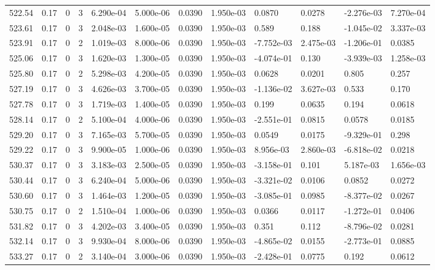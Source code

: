 \documentclass[preview]{standalone}
\begin{document}
{{{{{{{{{{{{{{{{\begin{tabular}{L{1.2cm}C{1.2cm} C{0.3cm}C{0.5cm} C{1.4cm}C{1.4cm} C{1.4cm}C{1.4cm} C{1.6cm}C{1.6cm} C{1.6cm}C{1.6cm}}
  522.54  &  0.17  & 0     &  3 &  6.290e-04  & 5.000e-06  &  0.0390&   1.950e-03& 0.0870 & 0.0278   &  -2.276e-03 & 7.270e-04  \\ 
  523.61  &  0.17  & 0     &  3 &  2.048e-03  & 1.600e-05  &  0.0390&   1.950e-03& 0.589 & 0.188   &  -1.045e-02 & 3.337e-03  \\ 
  523.91  &  0.17  & 0     &  2 &  1.019e-03  & 8.000e-06  &  0.0390&   1.950e-03& -7.752e-03 & 2.475e-03   &  -1.206e-01 & 0.0385  \\ 
  525.06  &  0.17  & 0     &  3 &  1.620e-03  & 1.300e-05  &  0.0390&   1.950e-03& -4.074e-01 & 0.130   &  -3.939e-03 & 1.258e-03  \\ 
  525.80  &  0.17  & 0     &  2 &  5.298e-03  & 4.200e-05  &  0.0390&   1.950e-03& 0.0628 & 0.0201   &  0.805 & 0.257  \\ 
  527.19  &  0.17  & 0     &  3 &  4.626e-03  & 3.700e-05  &  0.0390&   1.950e-03& -1.136e-02 & 3.627e-03   &  0.533 & 0.170  \\ 
  527.78  &  0.17  & 0     &  3 &  1.719e-03  & 1.400e-05  &  0.0390&   1.950e-03& 0.199 & 0.0635   &  0.194 & 0.0618  \\ 
  528.14  &  0.17  & 0     &  2 &  5.100e-04  & 4.000e-06  &  0.0390&   1.950e-03& -2.551e-01 & 0.0815   &  0.0578 & 0.0185  \\ 
  529.20  &  0.17  & 0     &  3 &  7.165e-03  & 5.700e-05  &  0.0390&   1.950e-03& 0.0549 & 0.0175   &  -9.329e-01 & 0.298  \\ 
  529.22  &  0.17  & 0     &  3 &  9.900e-05  & 1.000e-06  &  0.0390&   1.950e-03& 8.956e-03 & 2.860e-03   &  -6.818e-02 & 0.0218  \\ 
  530.37  &  0.17  & 0     &  3 &  3.183e-03  & 2.500e-05  &  0.0390&   1.950e-03& -3.158e-01 & 0.101   &  5.187e-03 & 1.656e-03  \\ 
  530.44  &  0.17  & 0     &  3 &  6.240e-04  & 5.000e-06  &  0.0390&   1.950e-03& -3.321e-02 & 0.0106   &  0.0852 & 0.0272  \\ 
  530.60  &  0.17  & 0     &  3 &  1.464e-03  & 1.200e-05  &  0.0390&   1.950e-03& -3.085e-01 & 0.0985   &  -8.377e-02 & 0.0267  \\ 
  530.75  &  0.17  & 0     &  2 &  1.510e-04  & 1.000e-06  &  0.0390&   1.950e-03& 0.0366 & 0.0117   &  -1.272e-01 & 0.0406  \\ 
  531.82  &  0.17  & 0     &  3 &  4.202e-03  & 3.400e-05  &  0.0390&   1.950e-03& 0.351 & 0.112   &  -8.796e-02 & 0.0281  \\ 
  532.14  &  0.17  & 0     &  3 &  9.930e-04  & 8.000e-06  &  0.0390&   1.950e-03& -4.865e-02 & 0.0155   &  -2.773e-01 & 0.0885  \\ 
  533.27  &  0.17  & 0     &  2 &  3.140e-04  & 3.000e-06  &  0.0390&   1.950e-03& -2.428e-01 & 0.0775   &  0.192 & 0.0612  \\ 
\hline 
\end{tabular} 

}}}}}}}}}}}}}}}}
\end{document}

